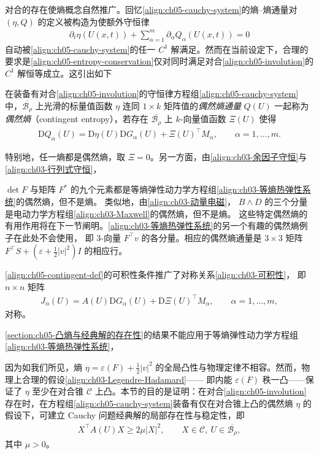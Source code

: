 \documentclass[../../main.tex]{subfiles}
\begin{document}
对合的存在使熵概念自然推广。回忆\eqref{align:ch05-cauchy-system}的熵--熵通量对 $(\eta,Q)$ 的定义被构造为使额外守恒律
\begin{align}
\partial_{t}\eta(U(x,t))+\sum_{\alpha=1}^{m}\partial_{\alpha}Q_{\alpha}(U(x,t))=0\label{align:ch05-entropy-conservation}
\end{align}
自动被\eqref{align:ch05-cauchy-system}的任一 $C^{1}$ 解满足。然而在当前设定下，合理的要求是\eqref{align:ch05-entropy-conservation}仅对同时满足对合\eqref{align:ch05-involution}的 $C^{1}$ 解恒等成立。这引出如下

\begin{definition}[偶然熵]\label{definition:ch05-contingent-entropy}
在装备有对合\eqref{align:ch05-involution}的守恒律方程组\eqref{align:ch05-cauchy-system}中，$\overline{\mathscr{B}_{\rho}}$ 上光滑的标量值函数 $\eta$ 连同 $1\times k$ 矩阵值的\emph{偶然熵通量} $Q(U)$ 一起称为\emph{偶然熵}（contingent entropy），若存在 $\overline{\mathscr{B}_{\rho}}$ 上 $k$-向量值函数 $\Xi(U)$ 使得
\begin{align}
\mathrm{D}Q_{\alpha}(U)=\mathrm{D}\eta(U)\mathrm{D}G_{\alpha}(U)+\Xi(U)^{\top}M_{\alpha},\qquad\alpha=1,\ldots,m.\label{align:ch05-contingent-def}
\end{align}
\end{definition}

特别地，任一熵都是偶然熵，取 $\Xi=0$。另一方面，由\eqref{align:ch03-余因子守恒}与\eqref{align:ch03-行列式守恒}，

$\det F$ 与矩阵 $F^{*}$ 的九个元素都是等熵弹性动力学方程组\eqref{align:ch03-等熵热弹性系统}的偶然熵，但不是熵。
类似地，由\eqref{align:ch03-动量电磁}，
$B\wedge D$ 的三个分量是电动力学方程组\eqref{align:ch03-Maxwell}的偶然熵，但不是熵。
这些特定偶然熵的有用作用将在下一节阐明。\eqref{align:ch03-等熵热弹性系统}的另一个有趣的偶然熵例子在此处不会使用，
即 3-向量 $F^{\top}v$ 的各分量。相应的偶然熵通量是 $3\times3$ 矩阵 $F^{\top}S+(\varepsilon+\frac{1}{2}|v|^{2})I$ 的相应行。

\eqref{align:ch05-contingent-def}的可积性条件推广了对称关系\eqref{align:ch03-可积性}，
即 $n\times n$ 矩阵
\begin{align}
J_{\alpha}(U)=A(U)\mathrm{D}G_{\alpha}(U)+\mathrm{D}\Xi(U)^{\top}M_{\alpha},\qquad\alpha=1,\ldots,m,\label{align:ch05-Jalpha-contingent}
\end{align}
对称。

\cref{section:ch05-凸熵与经典解的存在性}的结果不能应用于等熵弹性动力学方程组\eqref{align:ch03-等熵热弹性系统}，

因为如我们所见，熵 $\eta=\varepsilon(F)+\frac{1}{2}|v|^{2}$ 的全局凸性与物理定律不相容。然而，物理上合理的假设\eqref{align:ch03-Legendre-Hadamard}——
即内能 $\varepsilon(F)$ 秩一凸——保证了 $\eta$ 至少在对合锥 $\mathscr{C}$ 上凸。本节的目的是证明：在对合\eqref{align:ch05-involution}存在时，在方程组\eqref{align:ch05-cauchy-system}装备有仅在对合锥上凸的偶然熵 $\eta$ 的假设下，可建立 Cauchy 问题经典解的局部存在性与稳定性，即
\begin{align}
X^{\top}A(U)X\geqslant 2\mu|X|^{2},\qquad X\in\mathscr{C},\ U\in\overline{\mathscr{B}_{\rho}},\label{align:ch05-cone-convex}
\end{align}
其中 $\mu>0$。
\end{document}
